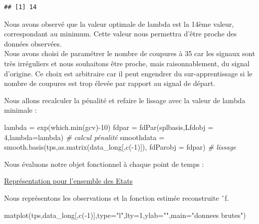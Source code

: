 \documentclass[
]{article}
\newenvironment{Shaded}{\begin{snugshade}}{\end{snugshade}}
\newcommand{\AttributeTok}[1]{\textcolor[rgb]{0.77,0.63,0.00}{#1}}
\newcommand{\CommentTok}[1]{\textcolor[rgb]{0.56,0.35,0.01}{\textit{#1}}}
\newcommand{\DecValTok}[1]{\textcolor[rgb]{0.00,0.00,0.81}{#1}}
\newcommand{\FunctionTok}[1]{\textcolor[rgb]{0.00,0.00,0.00}{#1}}
\newcommand{\NormalTok}[1]{#1}
\newcommand{\OtherTok}[1]{\textcolor[rgb]{0.56,0.35,0.01}{#1}}
\newcommand{\SpecialCharTok}[1]{\textcolor[rgb]{0.00,0.00,0.00}{#1}}
\newcommand{\StringTok}[1]{\textcolor[rgb]{0.31,0.60,0.02}{#1}}
\begin{document}
\begin{verbatim}
## [1] 14
\end{verbatim}

Nous avons observé que la valeur optimale de lambda est la 14ème valeur,
correspondant au minimum. Cette valeur nous permettra d'être proche des
données observées.\\
Nous avons choisi de paramétrer le nombre de coupures à 35 car les
signaux sont très irréguliers et nous souhaitons être proche, mais
raisonnablement, du signal d'origine. Ce choix est arbitraire car il
peut engendrer du sur-apprentissage si le nombre de coupures est trop
élevée par rapport au signal de départ.

Nous allons recalculer la pénalité et refaire le lissage avec la valeur
de lambda minimale :

\begin{Shaded}
\begin{Highlighting}[]
\NormalTok{lambda }\OtherTok{=} \FunctionTok{exp}\NormalTok{(}\FunctionTok{which.min}\NormalTok{(gcv)}\SpecialCharTok{{-}}\DecValTok{10}\NormalTok{)}
\NormalTok{fdpar }\OtherTok{=} \FunctionTok{fdPar}\NormalTok{(splbasis,}\AttributeTok{Lfdobj =} \DecValTok{4}\NormalTok{,}\AttributeTok{lambda=}\NormalTok{lambda) }\CommentTok{\# calcul pénalité}
\NormalTok{smoothdata }\OtherTok{=} \FunctionTok{smooth.basis}\NormalTok{(tps,}\FunctionTok{as.matrix}\NormalTok{(data\_long[,}\FunctionTok{c}\NormalTok{(}\SpecialCharTok{{-}}\DecValTok{1}\NormalTok{)]),}
                          \AttributeTok{fdParobj =}\NormalTok{ fdpar) }\CommentTok{\# lissage}
\end{Highlighting}
\end{Shaded}

Nous évaluons notre objet fonctionnel à chaque point de temps :

\begin{Shaded}
\end{Shaded}

\uline{Représentation pour l'ensemble des Etats}

Nous représentons les observations et la fonction estimée reconstruite
ˆf.

\begin{Shaded}
\begin{Highlighting}[]
\FunctionTok{matplot}\NormalTok{(tps,data\_long[,}\FunctionTok{c}\NormalTok{(}\SpecialCharTok{{-}}\DecValTok{1}\NormalTok{)],}\AttributeTok{type=}\StringTok{"l"}\NormalTok{,}\AttributeTok{lty=}\DecValTok{1}\NormalTok{,}\AttributeTok{ylab=}\StringTok{""}\NormalTok{,}\AttributeTok{main=}\StringTok{"donnees brutes"}\NormalTok{)}
\end{Highlighting}
\end{Shaded}
\end{document}
